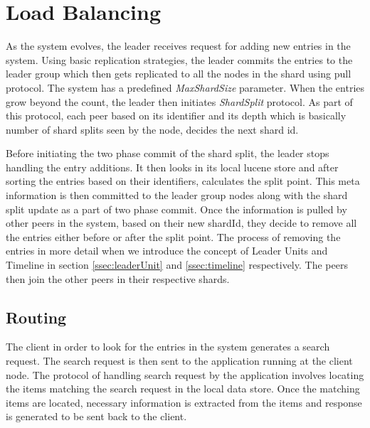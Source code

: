 \documentclass[a4paper,11pt]{kth-mag}
\begin{document}
\section{Load Balancing}
\label{ssec:loadBalance}
As the system evolves, the leader receives request for adding new entries in the system. Using basic replication strategies, the leader commits the entries to the leader group which then gets replicated to all the nodes in the shard using pull protocol. The system has a predefined \textit{MaxShardSize} parameter. When the entries grow beyond the count, the leader then initiates \textit{ShardSplit} protocol. As part of this protocol, each peer based on its identifier and its depth which is basically number of shard splits seen by the node, decides the next shard id.
\par Before initiating the two phase commit of the shard split, the leader stops handling the entry additions. It then looks in its local lucene store and after sorting the entries based on their identifiers, calculates the split point. This meta information is then committed to the leader group nodes along with the shard split update as a part of two phase commit. Once the information is pulled by other peers in the system, based on their new shardId, they decide to remove all the entries either before or after the split point. The process of removing the entries in more detail when we introduce the concept of Leader Units and Timeline in section \ref{ssec:leaderUnit} and \ref{ssec:timeline} respectively. The peers then join the other peers in their respective shards.



\subsection{Routing}
\label{ssec:routing}

\par The client in order to look for the entries in the system generates a search request. The search request is then sent to the application running at the client node. The protocol of handling search request by the application involves locating the items matching the search request in the local data store. Once the matching items are located, necessary information is extracted from the items and response is generated to be sent back to the client.
\end{document}
